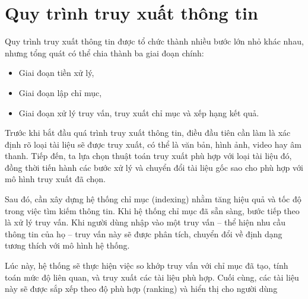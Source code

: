 \section{Quy trình truy xuất thông tin}
Quy trình truy xuất thông tin được tổ chức thành nhiều bước lớn nhỏ khác nhau, nhưng tổng quát có thể chia thành ba giai đoạn chính:

\begin{itemize}
    \item Giai đoạn tiền xử lý,
    \item Giai đoạn lập chỉ mục,
    \item Giai đoạn xử lý truy vấn, truy xuất chỉ mục và xếp hạng kết quả.
\end{itemize}

Trước khi bắt đầu quá trình truy xuất thông tin, điều đầu tiên cần làm là xác định rõ loại tài liệu sẽ được truy xuất, có thể là văn bản, hình ảnh, video hay âm thanh. Tiếp đến, ta lựa chọn thuật toán truy xuất phù hợp với loại tài liệu đó, đồng thời tiến hành các bước xử lý và chuyển đổi tài liệu gốc sao cho phù hợp với mô hình truy xuất đã chọn.

Sau đó, cần xây dựng hệ thống chỉ mục (indexing) nhằm tăng hiệu quả và tốc độ trong việc tìm kiếm thông tin. Khi hệ thống chỉ mục đã sẵn sàng, bước tiếp theo là xử lý truy vấn. Khi người dùng nhập vào một truy vấn -- thể hiện nhu cầu thông tin của họ -- truy vấn này sẽ được phân tích, chuyển đổi về định dạng tương thích với mô hình hệ thống.

Lúc này, hệ thống sẽ thực hiện việc so khớp truy vấn với chỉ mục đã tạo, tính toán mức độ liên quan, và truy xuất các tài liệu phù hợp. Cuối cùng, các tài liệu này sẽ được sắp xếp theo độ phù hợp (ranking) và hiển thị cho người dùng




